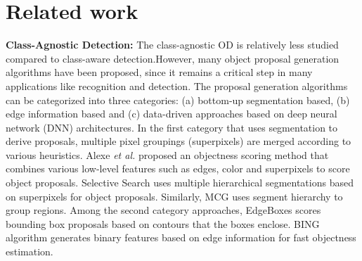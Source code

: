 \documentclass[runningheads]{llncs}
\def\etal{\emph{et al.}\xspace}
\begin{document}
\begin{table*}[!h]
\caption{Class-agnostic object detection performance of MDETR \cite{mdetr} for different convolutional backbones. The results indicate that the use of strong backbone improves the results especially on the out-of-domain (Kitchen \cite{kitchen}, Clipart, Comic, Watercolor \cite{clipart-comic-water}) datasets.}
\begin{center}
\end{center}
\label{table12:r101_vs_e5}
\end{table*}


\section{Related work}\label{app:related_work}
\noindent \textbf{Class-Agnostic Detection:} 
The class-agnostic OD is relatively less studied compared to class-aware detection.However, many object proposal generation algorithms have been proposed, since it remains a critical step in many applications like recognition and detection. The proposal generation algorithms can be categorized into three categories: (a) bottom-up segmentation based, (b) edge information based and (c) data-driven approaches based on deep neural network (DNN) architectures. 
In the first category that uses segmentation to derive proposals, multiple pixel groupings (superpixels) are merged according to various heuristics. Alexe \etal proposed an objectness \cite{alexe2012measuring} scoring method that combines various low-level features such as edges, color and superpixels to score object proposals. Selective Search \cite{uijlings2013selective} uses multiple hierarchical segmentations based on superpixels for object proposals. Similarly, MCG \cite{pont2016multiscale} uses segment hierarchy to group regions. Among the second category approaches, EdgeBoxes \cite{zitnick2014edge} scores bounding box proposals based on contours that the boxes enclose. BING algorithm \cite{cheng2014bing,zhang2015bing++} generates binary features based on edge information for fast objectness estimation. 
\end{document}
